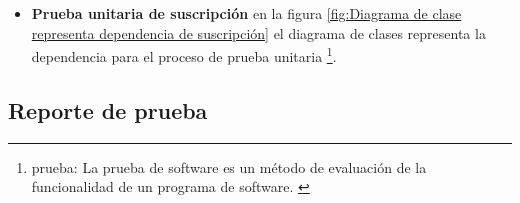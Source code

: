 \begin{itemize}

\item \textbf{Prueba unitaria de suscripción} en la figura 
\ref{fig:Diagrama de clase representa dependencia de suscripción}
el diagrama de clases representa la dependencia para el proceso de prueba
unitaria \footnote{prueba: La prueba de software es un método de evaluación
de la funcionalidad de un programa de software. \cite{test}}.

\begin{minipage}{1.0\textwidth}
	\centering
	\label{fig:Diagrama de clase representa dependencia de suscripción}
\end{minipage}

\end{itemize}

\subsection{Reporte de prueba}

